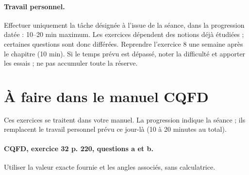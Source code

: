 \paragraph{Travail personnel.} Effectuer uniquement la tâche désignée à l’issue de la séance, dans la progression datée : 10–20 min maximum. Les exercices dépendent des notions déjà étudiées ; certaines questions sont donc différées. Reprendre l’exercice 8 une semaine après le chapitre (10 min). Si le temps prévu est dépassé, noter la difficulté et apporter les essais ; ne pas accumuler toute la réserve.
\endgroup
{}\section*{À faire dans le manuel CQFD}
Ces exercices se traitent dans votre manuel. La progression indique la séance ; ils remplacent le travail personnel prévu ce jour-là (10 à 20 minutes au total).
\paragraph{CQFD, exercice 32 p. 220, questions a et b.}\label{C10-M1} Utiliser la valeur exacte fournie et les angles associés, sans calculatrice.
